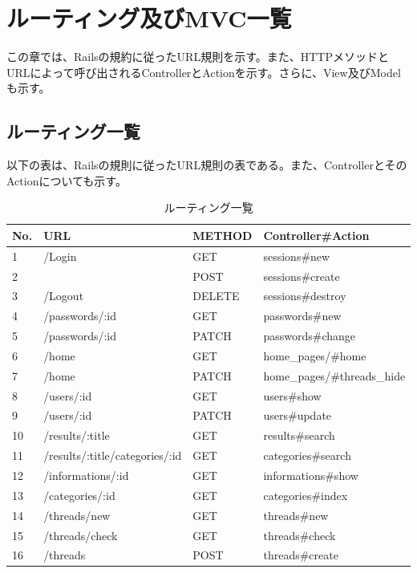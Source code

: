 \documentclass[a4j]{jarticle}
\begin{document}
\section{ルーティング及びMVC一覧}
この章では、Railsの規約に従ったURL規則を示す。また、HTTPメソッドとURLによって呼び出されるControllerとActionを示す。さらに、View及びModelも示す。
\newpage
\subsection{ルーティング一覧}
以下の表は、Railsの規則に従ったURL規則の表である。また、ControllerとそのActionについても示す。



\begin{table}[htb]
  \caption{ルーティング一覧}
  \centering
  \begin{tabular}{|l|l|l||l|} \hline
    No.&   URL 						&METHOD & Controller\#Action \\ \hline \hline
	 1&	/Login  					 	& GET      & sessions\#new       \\
       2&  	~		         			& POST    & sessions\#create	\\
	 3&	/Logout   				      &DELETE   &sessions\#destroy	\\
	 4&	/passwords/:id					&GET	  &passwords\#new    \\
	 5 & /passwords/:id					&PATCH	  &passwords\#change \\
	 6&	/home   						& GET 	   &home\_pages/\#home    \\
       7&	/home   						& PATCH 	   &home\_pages/\#threads\_hide \\
	 8&	/users/:id     					&  GET  	    &  users\#show       \\
	 9&	/users/:id     					 & PATCH   &  users\#update       \\
	10&	/results/:title         			& GET   	    & results\#search      \\
	11& /results/:title/categories/:id		&GET		& categories\#search	\\
	12&	/informations/:id				  & GET       & informations\#show      \\
	13&	/categories/:id    		   		 &   GET      & categories\#index    \\
	14&	/threads/new      	 	  		 &  GET      &  threads\#new         \\
	15&/threads/check      		       &  GET      & threads\#check       \\
	16&/threads                   		       &  POST    &threads\#create      \\

\end{tabular}
\end{table}
\end{document}
